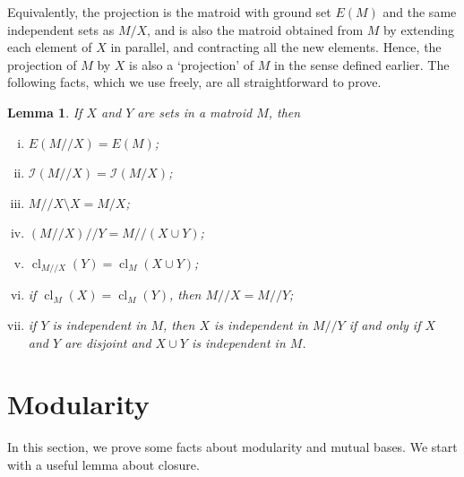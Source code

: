 \documentclass{amsart}
\theoremstyle{plain}
\newtheorem{lemma}[theorem]{Lemma}
\theoremstyle{definition}
\newcommand{\cI}{\mathcal{I}}
\newcommand{\dcon}{/ \!\! /}
\DeclareMathOperator{\cl}{cl}
\newcommand{\del}{\!\setminus\!}
\newcommand{\con}{/}
\begin{document}
Equivalently, the projection is the matroid with ground set $E(M)$ 
and the same independent sets as $M \con X$, and is also 
the matroid obtained from $M$ by extending each 
element of $X$ in parallel, and contracting all the new elements. 
Hence, the projection of $M$ by $X$ is also a `projection' of $M$ in the sense defined earlier. 
The following facts, which we use freely, are all straightforward to prove. 
\begin{lemma}
  If $X$ and $Y$ are sets in a matroid $M$, then 
  \begin{enumerate}[(i)]
    \item $E(M \dcon X) = E(M)$;
    \item $\cI(M \dcon X) = \cI(M \con X)$;
    \item $M \dcon X \del X = M \con X$;
    \item $(M \dcon X) \dcon Y = M \dcon (X \cup Y)$;
    \item $\cl_{M \dcon X}(Y) = \cl_M(X \cup Y)$;
    \item if $\cl_M(X) = \cl_M(Y)$, then $M \dcon X = M \dcon Y$;
    \item if $Y$ is independent in $M$, then $X$ is independent 
      in $M \dcon Y$ if and only if $X$ and $Y$ are disjoint and $X \cup Y$ is independent in $M$. 
  \end{enumerate}

\end{lemma}

\section{Modularity}

In this section, we prove some facts about modularity and mutual bases. 
We start with a useful lemma about closure. 
 
\end{document}
